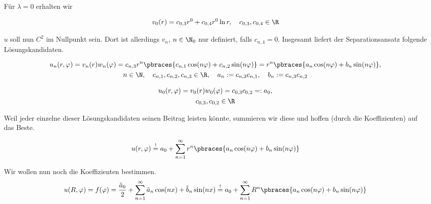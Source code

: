 \begin{solution}
\begin{enumerate}[label = (\roman*)]
    Für $\lambda = 0$ erhalten wir

    \begin{align*}
        v_0(r)
        =
        c_{0, 3} r^0 + c_{0, 4} r^0 \ln{r},
        \quad
        c_{0, 3}, c_{0, 4} \in \R
    \end{align*}

    $u$ soll nun $C^2$ im Nullpunkt sein.
    Dort ist allerdings $v_n$, $n \in \N_0$ nur definiert, falls $c_{n, 4} = 0$.
    Insgesamt liefert der Separationsansatz folgende Lösungskandidaten.

    \begin{gather*}
        u_n(r,\varphi)
        =
        v_n(r) w_n(\varphi)
        =
        c_{n, 3} r^n
        \pbraces
        {
            c_{n, 1} \cos(n \varphi)
            +
            c_{n, 2} \sin(n \varphi)
        }
        =
        r^n
        \pbraces
        {
            a_n \cos(n \varphi)
            +
            b_n \sin(n \varphi)
        }, \\
        n \in \N,
        \quad
        c_{n, 1}, c_{n, 2}, c_{n, 3} \in \R,
        \quad
        a_n := c_{n, 3} c_{n, 1},
        \quad
        b_n := c_{n, 3} c_{n, 2}
    \end{gather*}

    \begin{gather*}
        u_0(r, \varphi)
        =
        v_0(r) w_0(\varphi)
        =
        c_{0, 3}
        c_{0, 2}
        =:
        a_0, \\
        c_{0, 3}, c_{0, 2} \in \R
    \end{gather*}

    Weil jeder einzelne dieser Lösungskandidaten seinen Beitrag leisten könnte, summieren wir diese und hoffen (durch die Koeffizienten) auf das Beste.

    \begin{align*}
        u(r, \varphi)
        \stackrel{!}{=}
        a_0 +
        \sum_{n=1}^\infty
        r^n
        \pbraces
        {
            a_n \cos(n \varphi)
            +
            b_n \sin(n \varphi)
        }
    \end{align*}

    Wir wollen nun noch die Koeffizienten bestimmen.
    \begin{align*}
      u(R,\varphi) = f(\varphi) = \frac{\tilde{a}_0}{2} + \sum_{n=1}^{\infty}\tilde{a}_n\cos(nx) + \tilde{b}_n\sin(nx)
      \stackrel{!}{=}
      a_0 +
      \sum_{n=1}^\infty
      R^n
      \pbraces
      {
          a_n \cos(n \varphi)
          +
          b_n \sin(n \varphi)
      }
    \end{align*}


\end{enumerate}
\end{solution}
